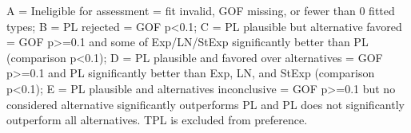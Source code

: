 \begin{flushleft}\footnotesize A = Ineligible for assessment = fit invalid, GOF missing, or fewer than 0 fitted types; B = PL rejected = GOF p<0.1; C = PL plausible but alternative favored = GOF p>=0.1 and some of Exp/LN/StExp significantly better than PL (comparison p<0.1); D = PL plausible and favored over alternatives = GOF p>=0.1 and PL significantly better than Exp, LN, and StExp (comparison p<0.1); E = PL plausible and alternatives inconclusive = GOF p>=0.1 but no considered alternative significantly outperforms PL and PL does not significantly outperform all alternatives. TPL is excluded from preference.\end{flushleft}
